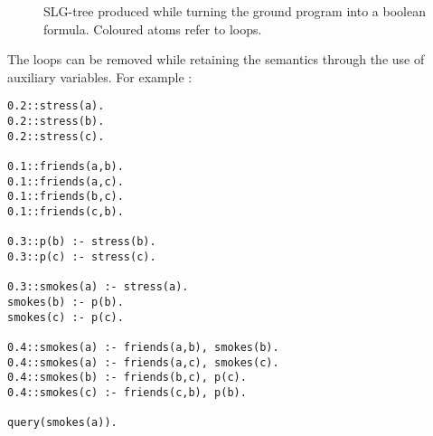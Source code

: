 \begin{figure}[h]
\begin{tikzpicture}
\end{tikzpicture}
\caption{SLG-tree produced while turning the ground program into a boolean formula. Coloured atoms refer to loops.}
\label{fig:nestedtries}
\end{figure}

\noindent The loops can be removed while retaining the semantics through the use of auxiliary variables. For example :
\begin{code}
\begin{verbatim}
0.2::stress(a).
0.2::stress(b).
0.2::stress(c).

0.1::friends(a,b).
0.1::friends(a,c).
0.1::friends(b,c).
0.1::friends(c,b).

0.3::p(b) :- stress(b).
0.3::p(c) :- stress(c).

0.3::smokes(a) :- stress(a).
smokes(b) :- p(b).
smokes(c) :- p(c).

0.4::smokes(a) :- friends(a,b), smokes(b).
0.4::smokes(a) :- friends(a,c), smokes(c).
0.4::smokes(b) :- friends(b,c), p(c).
0.4::smokes(c) :- friends(c,b), p(b).

query(smokes(a)).
\end{verbatim}
\label{code:base}
\vspace{0.5cm}
\end{code}

